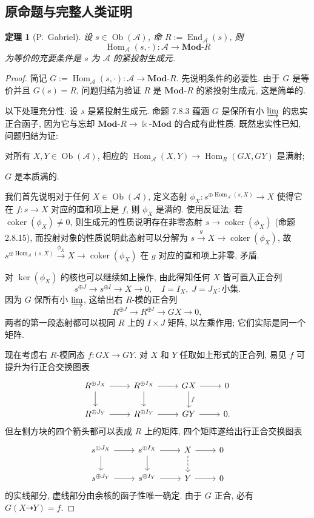 \documentclass[11pt]{article}
\newcommand{\Obj}{\operatorname{Ob}}
\newcommand{\Hom}{\operatorname{Hom}}
\newcommand{\End}{\operatorname{End}}
\newcommand{\Ker}{\operatorname{ker}}
\newcommand{\Coker}{\operatorname{coker}}
\newcommand{\cated}[1]{\mathbf{#1}\text{-}}
\newcommand{\dcate}[1]{\text{-}\mathbf{#1}}
\newcommand{\CorpusNumber}{0}
\newtheorem{theorem}{定理}
\theoremstyle{definition}
\begin{document}
\subsection*{原命题与完整人类证明}
\def\CorpusNumber{7.8.4}
\begin{theorem}[P.\ Gabriel]\label{prop:identify-ModR}
	设 $s \in \Obj(\mathcal{A})$, 命 $R := \End_{\mathcal{A}}(s)$, 则
	\[ \Hom_{\mathcal{A}}(s, \cdot): \mathcal{A} \to \cated{Mod}R \]
	为等价的充要条件是 $s$ 为 $\mathcal{A}$ 的紧投射生成元.
\end{theorem}
\begin{proof}
	简记 $G := \Hom_{\mathcal{A}}(s, \cdot): \mathcal{A} \to \cated{Mod}R$. 先说明条件的必要性. 由于 $G$ 是等价并且 $G(s) = R$, 问题归结为验证 $R$ 是 $\cated{Mod}R$ 的紧投射生成元, 这是简单的.
	
	以下处理充分性. 设 $s$ 是紧投射生成元. 命题 7.8.3 蕴涵 $G$ 是保所有小 $\varinjlim$ 的忠实正合函子, 因为它与忘却 $\cated{Mod}R \to \Bbbk\dcate{Mod}$ 的合成有此性质. 既然忠实性已知, 问题归结为证:
	\begin{compactitem}
		\item 对所有 $X, Y \in \Obj(\mathcal{A})$, 相应的 $\Hom_{\mathcal{A}}(X, Y) \to \Hom_R(GX, GY)$ 是满射;
		\item $G$ 是本质满的.
	\end{compactitem}
	
	我们首先说明对于任何 $X \in \Obj(\mathcal{A})$, 定义态射 $\phi_X: s^{\oplus \Hom_{\mathcal{A}}(s, X)} \to X$ 使得它在 $f: s \to X$ 对应的直和项上是 $f$, 则 $\phi_X$ 是满的. 使用反证法: 若 $\Coker(\phi_X) \neq 0$, 则生成元的性质说明存在非零态射 $s \to \Coker(\phi_X)$ (命题 2.8.15), 而投射对象的性质说明此态射可以分解为 $s \xrightarrow{g} X \to \Coker(\phi_X)$, 故 $s^{\oplus \Hom_{\mathcal{A}}(s, X)} \xrightarrow{\phi_X} X \to \Coker(\phi_X)$ 在 $g$ 对应的直和项上非零, 矛盾.
	
	对 $\Ker(\phi_X)$ 的核也可以继续如上操作, 由此得知任何 $X$ 皆可置入正合列
	\[ s^{\oplus J} \to s^{\oplus I} \to X \to 0, \quad I = I_X, \; J = J_X: \text{小集}. \]
	因为 $G$ 保所有小 $\varinjlim$, 这给出右 $R$-模的正合列
	\[ R^{\oplus J} \to R^{\oplus I} \to GX \to 0, \]
	两者的第一段态射都可以视同 $R$ 上的 $I \times J$ 矩阵, 以左乘作用; 它们实际是同一个矩阵.
	
	现在考虑右 $R$-模同态 $f: GX \to GY$. 对 $X$ 和 $Y$ 任取如上形式的正合列, 易见 $f$ 可提升为行正合交换图表
	\[\begin{tikzcd}
		R^{\oplus J_X} \arrow[r] \arrow[d] & R^{\oplus I_X} \arrow[d] \arrow[r] & GX \arrow[d, "f"] \arrow[r] & 0 \\
		R^{\oplus J_Y} \arrow[r] & R^{\oplus I_Y} \arrow[r] & GY \arrow[r] & 0.
	\end{tikzcd}\]
	但左侧方块的四个箭头都可以表成 $R$ 上的矩阵, 四个矩阵遂给出行正合交换图表
	\[\begin{tikzcd}
		s^{\oplus J_X} \arrow[r] \arrow[d] & s^{\oplus I_X} \arrow[d] \arrow[r] & X \arrow[dashed, d] \arrow[r] & 0 \\
		s^{\oplus J_Y} \arrow[r] & s^{\oplus I_Y} \arrow[r] & Y \arrow[r] & 0
	\end{tikzcd}\]
	的实线部分, 虚线部分由余核的函子性唯一确定. 由于 $G$ 正合, 必有 $G(X \dashrightarrow Y) = f$.
	

\end{proof}
\end{document}
